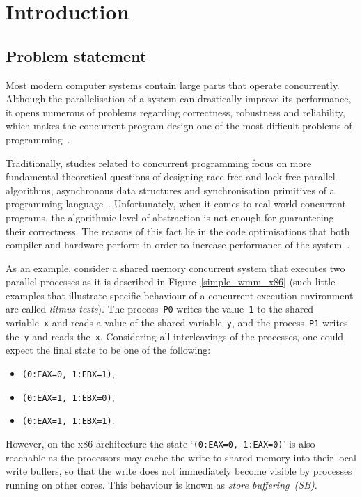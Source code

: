 \chapter{Introduction}
\label{ch:intro}


\section{Problem statement}
\label{ch:intro:problem}

Most modern computer systems contain large parts that operate concurrently.
Although the parallelisation of a system can drastically improve its performance, it opens numerous of problems regarding correctness, robustness and reliability, which makes the concurrent program design one of the most difficult problems of programming~\cite{mckenney2017parallel}.

Traditionally, studies related to concurrent programming focus on more fundamental theoretical questions of designing race-free and lock-free parallel algorithms, asynchronous data structures and synchronisation primitives of a programming language~\cite{ben2006principles}.
Unfortunately, when it comes to real-world concurrent programs, the algorithmic level of abstraction is not enough for guaranteeing their correctness.
The reasons of this fact lie in the code optimisations that both compiler and hardware perform in order to increase performance of the system~\cite{adve1996shared}.

As an example, consider a shared memory concurrent system that executes two parallel processes as it is described in Figure~\ref{simple_wmm_x86} (such little examples that illustrate specific behaviour of a concurrent execution environment are called \textit{litmus tests}).
The process~\texttt{P0} writes the value~\texttt{1} to the shared variable~\texttt{x} and reads a value of the shared variable~\texttt{y}, and the process~\texttt{P1} writes the~\texttt{y} and reads the~\texttt{x}.
Considering all interleavings of the processes, one could expect the final state to be one of the following:
\begin{itemize}[noitemsep,topsep=0pt]
\item \texttt{(0:EAX=0,\,1:EBX=1)},
\item \texttt{(0:EAX=1,\,1:EBX=0)},
\item \texttt{(0:EAX=1,\,1:EBX=1)}.
\end{itemize}
However, on the x86 architecture the state `\texttt{(0:EAX=0,\,1:EAX=0)}' is also reachable as the processors may cache the write to shared memory into their local write buffers, so that the write does not immediately become visible by processes running on other cores.
This behaviour is known as \textit{store buffering~(SB)}.

